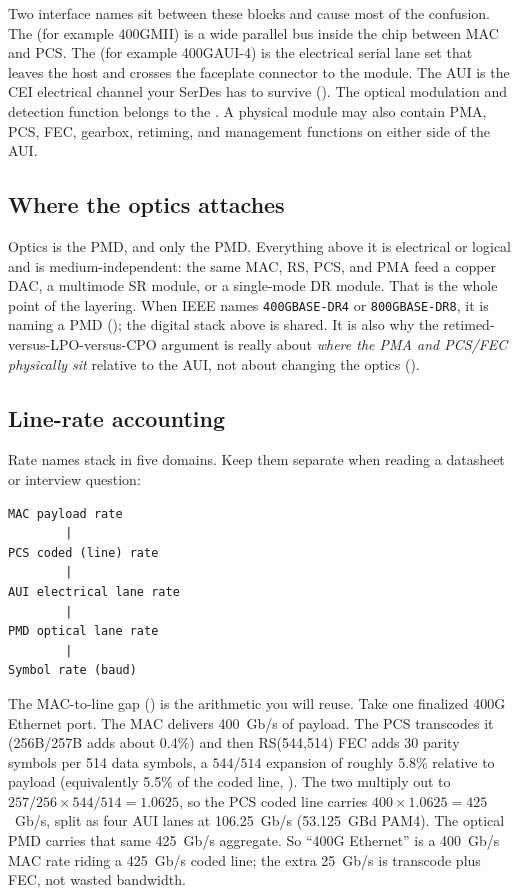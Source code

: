 Two interface names sit between these blocks and cause most of the confusion. The
 (for example 400GMII) is a wide parallel bus inside the
chip between MAC and PCS. The  (for example 400GAUI-4) is the
electrical serial lane set that leaves the host and crosses the faceplate connector
to the module. The AUI is the CEI electrical channel your SerDes has to survive
(). The optical modulation and detection function
belongs to the . A physical module may also contain PMA, PCS,
FEC, gearbox, retiming, and management functions on either side of the AUI.

\subsection{Where the optics attaches}

Optics is the PMD, and only the PMD. Everything above it is electrical or logical and
is medium-independent: the same MAC, RS, PCS, and PMA feed a copper DAC, a
multimode SR module, or a single-mode DR module. That is the whole point of the
layering. When IEEE names \texttt{400GBASE-DR4} or \texttt{800GBASE-DR8}, it is
naming a PMD (); the digital stack above is shared. It is also
why the retimed-versus-LPO-versus-CPO argument is really about \emph{where the PMA
and PCS/FEC physically sit} relative to the AUI, not about changing the optics
().

\subsection{Line-rate accounting}

Rate names stack in five domains. Keep them separate when reading a datasheet or
interview question:

\begin{center}
\begin{minipage}{0.92\linewidth}
\begin{verbatim}
MAC payload rate
        |
PCS coded (line) rate
        |
AUI electrical lane rate
        |
PMD optical lane rate
        |
Symbol rate (baud)
\end{verbatim}
\end{minipage}
\end{center}

The MAC-to-line gap () is the arithmetic you will reuse.
Take one finalized 400G Ethernet port. The MAC delivers 400~Gb/s of payload. The
PCS transcodes it (256B/257B adds about 0.4\%) and then RS(544,514) FEC adds 30
parity symbols per 514 data symbols, a $544/514$ expansion of roughly 5.8\% relative
to payload (equivalently 5.5\% of the coded line, ). The two multiply
out to $257/256 \times 544/514 = 1.0625$, so the PCS coded line carries
$400 \times 1.0625 = 425$~Gb/s, split as four AUI lanes at 106.25~Gb/s
(53.125~GBd PAM4). The optical PMD carries that same 425~Gb/s aggregate. So
``400G Ethernet'' is a 400~Gb/s MAC rate riding a 425~Gb/s coded line; the extra
25~Gb/s is transcode plus FEC, not wasted bandwidth.

